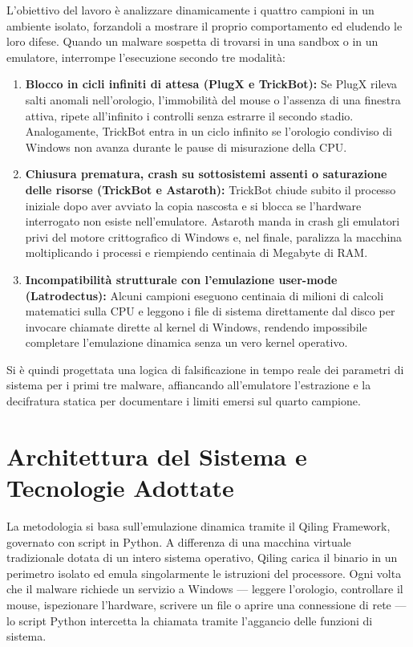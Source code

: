 \documentclass[11pt, a4paper]{article}
\begin{document}
	L'obiettivo del lavoro è analizzare dinamicamente i quattro campioni in un ambiente isolato, forzandoli a mostrare il proprio comportamento ed eludendo le loro difese. Quando un malware sospetta di trovarsi in una sandbox o in un emulatore, interrompe l'esecuzione secondo tre modalità:
	
	\begin{enumerate}
		\item \textbf{Blocco in cicli infiniti di attesa (PlugX e TrickBot):} Se PlugX rileva salti anomali nell'orologio, l'immobilità del mouse o l'assenza di una finestra attiva, ripete all'infinito i controlli senza estrarre il secondo stadio. Analogamente, TrickBot entra in un ciclo infinito se l'orologio condiviso di Windows non avanza durante le pause di misurazione della CPU.
		
		\item \textbf{Chiusura prematura, crash su sottosistemi assenti o saturazione delle risorse (TrickBot e Astaroth):} TrickBot chiude subito il processo iniziale dopo aver avviato la copia nascosta e si blocca se l'hardware interrogato non esiste nell'emulatore. Astaroth manda in crash gli emulatori privi del motore crittografico di Windows e, nel finale, paralizza la macchina moltiplicando i processi e riempiendo centinaia di Megabyte di RAM.
		
		\item \textbf{Incompatibilità strutturale con l'emulazione user-mode (Latrodectus):} Alcuni campioni eseguono centinaia di milioni di calcoli matematici sulla CPU e leggono i file di sistema direttamente dal disco per invocare chiamate dirette al kernel di Windows, rendendo impossibile completare l'emulazione dinamica senza un vero kernel operativo.
	\end{enumerate}
	
	Si è quindi progettata una logica di falsificazione in tempo reale dei parametri di sistema per i primi tre malware, affiancando all'emulatore l'estrazione e la decifratura statica per documentare i limiti emersi sul quarto campione.
	
	\section{Architettura del Sistema e Tecnologie Adottate}
	
	La metodologia si basa sull'emulazione dinamica tramite il Qiling Framework, governato con script in Python. A differenza di una macchina virtuale tradizionale dotata di un intero sistema operativo, Qiling carica il binario in un perimetro isolato ed emula singolarmente le istruzioni del processore. Ogni volta che il malware richiede un servizio a Windows --- leggere l'orologio, controllare il mouse, ispezionare l'hardware, scrivere un file o aprire una connessione di rete --- lo script Python intercetta la chiamata tramite l'aggancio delle funzioni di sistema.
	
\end{document}
